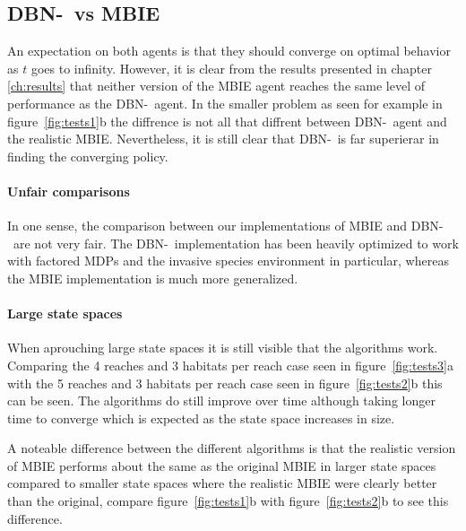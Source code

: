 \subsection{DBN-\etre\ vs MBIE }
An expectation on both agents is that they should converge on optimal behavior as $t$ goes to infinity. However, it is clear from the results presented in chapter \ref{ch:results} that neither version of the MBIE agent reaches the same level of performance as the DBN-\etre\ agent. In the smaller problem as seen for example in figure~\ref{fig:tests1}b the diffrence is not all that diffrent between DBN-\etre\ agent and the realistic MBIE. Nevertheless, it is still clear that DBN-\etre\ is far superierar in finding the converging policy.

\paragraph{Unfair comparisons} In one sense, the comparison between our implementations of MBIE and DBN-\etre\ are not very fair. The DBN-\etre\ implementation has been heavily optimized to work with factored MDPs and the invasive species environment in particular, whereas the MBIE implementation is much more generalized. %

\paragraph{Large state spaces}
When aprouching large state spaces it is still visible that the algorithms work. Comparing the 4 reaches and 3 habitats per reach case seen in figure~\ref{fig:tests3}a with the 5 reaches and 3 habitats per reach case seen in figure~\ref{fig:tests2}b this can be seen. The algorithms do still improve over time although taking longer time to converge which is expected as the state space increases in size. 

A noteable difference between the different algorithms is that the realistic version of MBIE performs about the same as the original MBIE in larger state spaces compared to smaller state spaces where the realistic MBIE were clearly better than the original, compare figure~\ref{fig:tests1}b with figure~\ref{fig:tests2}b to see this difference. 

